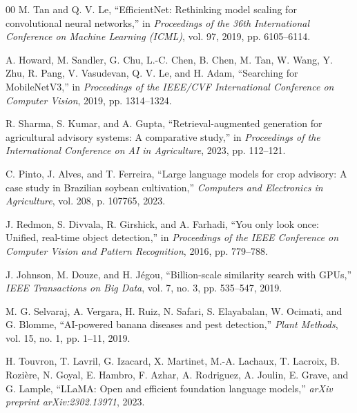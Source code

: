 \documentclass[conference]{IEEEtran}
\begin{document}
\begin{thebibliography}{00}
M. Tan and Q. V. Le, ``EfficientNet: Rethinking model scaling for convolutional neural networks,'' in \textit{Proceedings of the 36th International Conference on Machine Learning (ICML)}, vol. 97, 2019, pp. 6105--6114.

A. Howard, M. Sandler, G. Chu, L.-C. Chen, B. Chen, M. Tan, W. Wang, Y. Zhu, R. Pang, V. Vasudevan, Q. V. Le, and H. Adam, ``Searching for MobileNetV3,'' in \textit{Proceedings of the IEEE/CVF International Conference on Computer Vision}, 2019, pp. 1314--1324.

R. Sharma, S. Kumar, and A. Gupta, ``Retrieval-augmented generation for agricultural advisory systems: A comparative study,'' in \textit{Proceedings of the International Conference on AI in Agriculture}, 2023, pp. 112--121.

C. Pinto, J. Alves, and T. Ferreira, ``Large language models for crop advisory: A case study in Brazilian soybean cultivation,'' \textit{Computers and Electronics in Agriculture}, vol. 208, p. 107765, 2023.

J. Redmon, S. Divvala, R. Girshick, and A. Farhadi, ``You only look once: Unified, real-time object detection,'' in \textit{Proceedings of the IEEE Conference on Computer Vision and Pattern Recognition}, 2016, pp. 779--788.

J. Johnson, M. Douze, and H. J\'{e}gou, ``Billion-scale similarity search with GPUs,'' \textit{IEEE Transactions on Big Data}, vol. 7, no. 3, pp. 535--547, 2019.

M. G. Selvaraj, A. Vergara, H. Ruiz, N. Safari, S. Elayabalan, W. Ocimati, and G. Blomme, ``AI-powered banana diseases and pest detection,'' \textit{Plant Methods}, vol. 15, no. 1, pp. 1--11, 2019.

H. Touvron, T. Lavril, G. Izacard, X. Martinet, M.-A. Lachaux, T. Lacroix, B. Rozi\`{e}re, N. Goyal, E. Hambro, F. Azhar, A. Rodriguez, A. Joulin, E. Grave, and G. Lample, ``LLaMA: Open and efficient foundation language models,'' \textit{arXiv preprint arXiv:2302.13971}, 2023.

\end{thebibliography}
\end{document}
